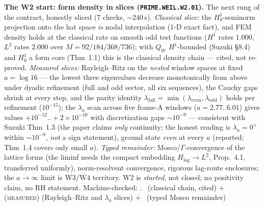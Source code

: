 \par\smallskip\noindent\textbf{The W2 start: form density in slices
(\texttt{PRIME.WEIL.W2.01}).}
The next rung of the contract, honestly sliced ($7$ checks,
${\sim}240$\,s).  \emph{Classical slice:} the $H^1_0$-seminorm
projection onto the hat space \emph{is} nodal interpolation (1-D exact
fact), and FEM density holds at the classical rate on smooth odd test
functions ($H^1$ rates $1.000$, $L^2$ rates $2.000$ over
$M=92/184/368/736$); with $Q_W$ $H^1$-bounded (Suzuki \S8.4) and
$H^1_0$ a form core (Thm~1.1) this is the classical density chain ---
cited, not re-proved.  \emph{Measured slices:} Rayleigh--Ritz on the
\emph{nested} window spaces at fixed $a=\log16$ --- the lowest three
eigenvalues decrease monotonically from above under dyadic refinement
(full and odd sector, all six sequences), the Cauchy gaps shrink at
every step, and the parity identity
$\lambda_{\mathrm{full}}=\min(\lambda_{\mathrm{even}},
\lambda_{\mathrm{odd}})$ holds per refinement ($10^{-15}$); the
$\lambda_a$ scan across five frame-A windows ($a=2.77..6.01$) gives
values $+10^{-12}..+2\times10^{-10}$ with discretization gaps
${\sim}10^{-9}$ --- consistent with Suzuki Thm~1.3 (the paper claims
\emph{only} continuity; the honest reading is $\lambda_a=0^+$ within
${\sim}10^{-9}$, \emph{not} a sign statement), ground state
\emph{even} at every $a$ (reported; Thm~1.4 covers only small $a$).
\emph{Typed remainder:} Mosco/$\Gamma$-convergence of the lattice
forms (the liminf needs the compact embedding
$H_{\log}\to L^2$, Prop.~4.1, transferred uniformly), norm-resolvent
convergence, rigorous lag-route enclosures; the $a\to\infty$ limit is
W3/W4 territory.  W2 is \emph{started}, not closed; no positivity
claim, no RH statement.
Machine-checked: .
\mC\ (classical chain, cited) $+$ (\textsc{measured}) (Rayleigh--Ritz
and $\lambda_a$ slices) $+$ \mC\ (typed Mosco remainder)
\par\smallskip


